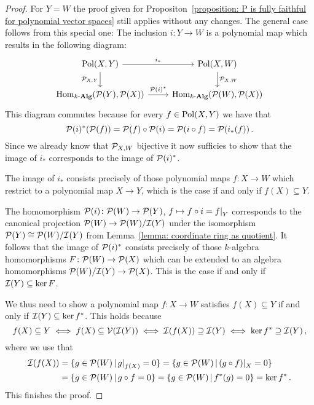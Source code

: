 \begin{proof}
  For $Y = W$ the proof given for Propositon~\ref{proposition: P is fully faithful for polynomial vector spaces} still applies without any changes.
  The general case follows from this special one:
  The inclusion $i \colon Y \to W$ is a polynomial map which results in the following diagram:
  \[
    \begin{tikzcd}
        \Pol(X,Y)
        \arrow{r}[above]{i_*}
        \arrow{d}[left]{\mc{P}_{X,Y}}
      & \Pol(X,W)
        \arrow{d}[right]{\mc{P}_{X,W}}
      \\
        \Hom_{\cAlg{k}}(\mc{P}(Y), \mc{P}(X))
        \arrow{r}[above]{\mc{P}(i)^*}
      & \Hom_{\cAlg{k}}(\mc{P}(W), \mc{P}(X))
    \end{tikzcd}
  \]
  This diagram commutes because for every $f \in \operatorname{Pol}(X,Y)$ we have that
  \[
      \mathcal{P}(i)^*( \mathcal{P}(f) )
    = \mathcal{P}(f) \circ \mathcal{P}(i)
    = \mathcal{P}( i \circ f )
    = \mathcal{P}( i_*(f) ) \,.
  \]
  Since we already know that $\mathcal{P}_{X,W}$ bijective it now sufficies to show that the image of $i_*$ corresponds to the image of $\mathcal{P}(i)^*$.
  
  The image of $i_*$ consists precisely of those polynomial maps $f \colon X \to W$ which restrict to a polynomial map $X \to Y$, which is the case if and only if $f(X) \subseteq Y$.
  
  The homomorphism $\mathcal{P}(i) \colon \mathcal{P}(W) \to \mathcal{P}(Y)$, $f \mapsto f \circ i = \restrict{f}{Y}$ corresponds to the canonical projection $\mathcal{P}(W) \to \mathcal{P}(W)/\mathcal{I}(Y)$ under the isomorphism $\mathcal{P}(Y) \cong \mathcal{P}(W)/\mathcal{I}(Y)$ from Lemma~\ref{lemma: coordinate ring as quotient}.
  It follows that the image of $\mathcal{P}(i)^*$ consists precisely of those $k$-algebra homomorphisms $F \colon \mathcal{P}(W) \to \mathcal{P}(X)$ which can be extended to an algebra homomorphisms $\mathcal{P}(W)/\mathcal{I}(Y) \to \mathcal{P}(X)$.
  This is the case if and only if $\mathcal{I}(Y) \subseteq \ker F$.
  
  We thus need to show a polynomial map $f \colon X \to W$ satisfies $f(X) \subseteq Y$ if and only if $\mathcal{I}(Y) \subseteq \ker f^*$.
  This holds because
  \[
          f(X) \subseteq Y
    \iff  f(X) \subseteq \mathcal{V}(\mathcal{I}(Y))
    \iff  \mathcal{I}(f(X)) \supseteq \mathcal{I}(Y)
    \iff  \ker f^* \supseteq \mathcal{I}(Y) \,,
  \]
  where we use that
  \begin{align*}
        \mc{I}(f(X))
    &=  \{
          g \in \mc{P}(W)
        \suchthat
          \restrict{g}{f(X)} = 0
        \}
      = \{
          g \in \mc{P}(W)
        \suchthat
          \restrict{(g \circ f)}{X} = 0
        \}
    \\
    &=  \{
          g \in \mc{P}(W)
        \suchthat
          g \circ f = 0
        \}
      = \{
          g \in \mc{P}(W)
        \suchthat
          f^*(g) = 0
        \}
      = \ker f^* \,.
  \end{align*}
  This finishes the proof.
\end{proof}


